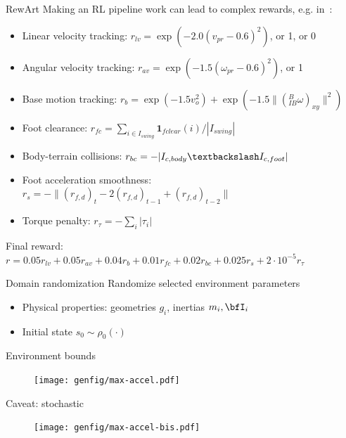 \documentclass[11pt, aspectratio=169]{beamer}
\begin{document}
\begin{frame}{RewArt}
    Making an RL pipeline work can lead to complex rewards, e.g. in~\cite{lee2020}:
    \begin{itemize}
        \item Linear velocity tracking: $r_{lv} = \exp(-2.0 (v_{pr} - 0.6)^2)$, or 1, or 0
        \item Angular velocity tracking: $r_{av} = \exp(-1.5 (\omega_{pr} - 0.6)^2)$, or 1
        \item Base motion tracking: $r_b = \exp(-1.5v_o^2) + \exp(-1.5 \|({}^B_{IB} \omega)_{xy}\|^2)$
        \item Foot clearance: $r_{fc} = \sum_{i \in I_{swing}} \mathbf{1}_{fclear}(i) / |I_{swing}|$
        \item Body-terrain collisions: $r_{bc} = -|I_{c,body} \textbackslash I_{c,foot}|$
        \item Foot acceleration smoothness: $r_{s} = -\| (r_{f,d})_t - 2(r_{f,d})_{t-1} + (r_{f,d})_{t-2}\|$
        \item Torque penalty: $r_{\tau} = -\sum_{i} | \tau_i |$
    \end{itemize}
    Final reward: $r = 0.05 r_{lv} + 0.05 r_{av} + 0.04 r_b + 0.01 r_{fc} + 0.02 r_{bc} + 0.025 r_s + 2 \cdot 10^{-5} r_{\tau}$
\end{frame}

\begin{frame}{Domain randomization}
    Randomize selected environment parameters
    \begin{itemize}
        \item Physical properties: geometries $g_i$, inertias $m_i, \bfI_i$
        \item Initial state $s_0 \sim \rho_0(\cdot)$
    \end{itemize}
\end{frame}

\begin{frame}{Environment bounds}
    \begin{figure}
        \centering
        \texttt{[image: genfig/max-accel.pdf]}
    \end{figure}
\end{frame}

\begin{frame}{Caveat: stochastic}
    \begin{figure}
        \centering
        \texttt{[image: genfig/max-accel-bis.pdf]}
    \end{figure}
\end{frame}
\end{document}
